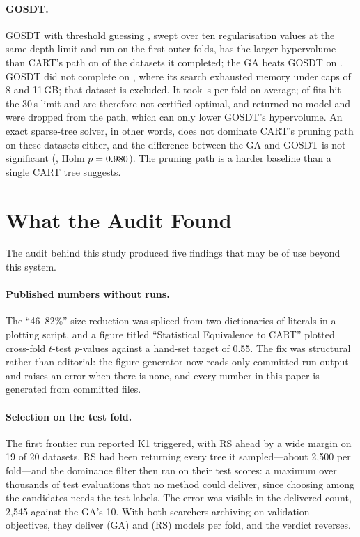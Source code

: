 \documentclass[11pt]{article}
\newcommand{\GA}{GA\xspace}
\newcommand{\RS}{RS\xspace}
\begin{document}
\paragraph{GOSDT.} GOSDT \citep{lin2020} with threshold guessing \citep{mctavish2022},
swept over ten regularisation values at the same depth limit and run on the first
\GosdtFolds{} outer folds, has the larger hypervolume than CART's path on
\GosdtBeatsCart{} of the \GosdtDatasets{} datasets it completed; the \GA beats GOSDT on
\GABeatsGosdt. GOSDT did not complete on \GosdtIncompleteNames{}, where its search
exhausted memory under caps of 8 and 11\,GB; that dataset is excluded. It took
\GosdtSeconds{}\,s per fold on average; \GosdtTimeouts{} of \GosdtFits{} fits hit the
30\,s limit and are therefore not certified optimal, and \GosdtFailures{} returned no
model and were dropped from the path, which can only lower GOSDT's hypervolume. An exact
sparse-tree solver, in other words, does not dominate CART's pruning path on these
datasets either, and the difference between the \GA and GOSDT is not significant
(\GosdtDiff, Holm $p=0.980$). The pruning path is a harder baseline than a single
CART tree suggests.

\section{What the Audit Found}
\label{sec:audit}

The audit behind this study produced five findings that may be of use beyond this
system.

\paragraph{Published numbers without runs.} The ``46--82\%'' size reduction was spliced
from two dictionaries of literals in a plotting script, and a figure titled ``Statistical
Equivalence to CART'' plotted cross-fold $t$-test $p$-values against a hand-set target of
0.55. The fix was structural rather than editorial: the figure generator now reads only
committed run output and raises an error when there is none, and every number in this
paper is generated from committed files.

\paragraph{Selection on the test fold.} The first frontier run reported K1 triggered,
with \RS{} ahead by a wide margin on 19 of 20 datasets. \RS{} had been returning every
tree it sampled---about 2{,}500 per fold---and the dominance filter then ran on their test
scores: a maximum over thousands of test evaluations that no method could deliver, since
choosing among the candidates needs the test labels. The error was visible in the
delivered count, 2{,}545 against the \GA's 10. With both searchers archiving on validation
objectives, they deliver \DeliveredGA{} (\GA) and \DeliveredRS{} (\RS) models per fold,
and the verdict reverses.
\end{document}

